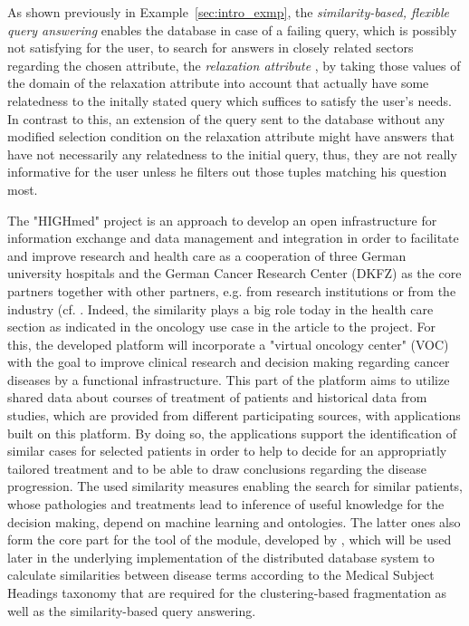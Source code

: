 As shown previously in Example~\ref{sec:intro_exmp}, the \emph{similarity-based, flexible query answering} \citep{Wiese2014} enables the database in case 
of a failing query, which is possibly not satisfying for the user, to search for answers in closely related sectors regarding the chosen attribute, 
the \emph{relaxation attribute} \citep{Wiese2014}, by taking those values of the domain of the relaxation attribute into account that actually have some 
relatedness to the initally stated query which suffices to satisfy the user's needs. In contrast to this, an extension of the query sent to the
database without any modified selection condition on the relaxation attribute might have answers that have not necessarily any relatedness to the initial
query, thus, they are not really informative for the user unless he filters out those tuples matching his question most.


The "HIGHmed" project \citep{Haarbrandt2018} is an approach to develop an open infrastructure for information exchange and data management and integration
in order to facilitate and improve research and health care as a cooperation of three German university hospitals and the German Cancer Research Center
(DKFZ) as the core partners together with other partners, e.g. from research institutions or from the industry (cf. \cite[Table~2]{Haarbrandt2018}.
Indeed, the similarity plays a big role today in the health care section as indicated in the oncology use case in the article to the project.
For this, the developed platform will incorporate a "virtual oncology center" (VOC) \citep{Haarbrandt2018} with the goal to improve clinical research and 
decision making regarding cancer diseases by a functional infrastructure. This part of the platform aims to utilize shared data about courses of
treatment of patients and historical data from studies, which are provided from different participating sources, with applications built on this platform.
By doing so, the applications support the identification of similar cases for selected patients in order to help to decide for an appropriatly tailored
treatment and to be able to draw conclusions regarding the disease progression. The used similarity measures enabling the search for similar patients,
whose pathologies and treatments lead to inference of useful knowledge for the decision making, depend on machine learning and ontologies. The latter ones
also form the core part for the tool of the  module, developed by \cite{McInnes2009}, which will be used later in the underlying
implementation of the distributed database system to calculate similarities between disease terms according to the Medical Subject Headings taxonomy that 
are required for the clustering-based fragmentation as well as the similarity-based query answering.



